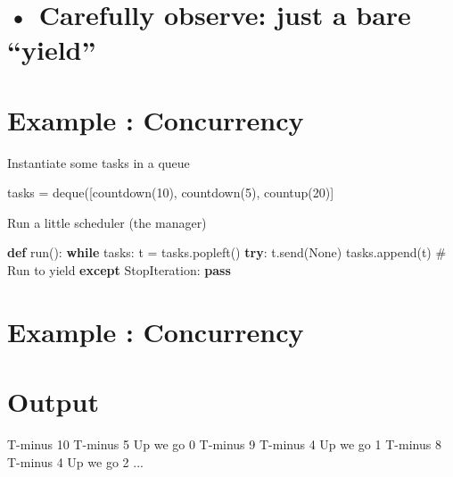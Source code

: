 \documentclass[
  letterpaper,
  DIV=11,
  numbers=noendperiod]{scrreprt}
\newenvironment{Shaded}{\begin{snugshade}}{\end{snugshade}}
\newcommand{\CommentTok}[1]{\textcolor[rgb]{0.37,0.37,0.37}{#1}}
\newcommand{\ControlFlowTok}[1]{\textcolor[rgb]{0.00,0.23,0.31}{\textbf{#1}}}
\newcommand{\KeywordTok}[1]{\textcolor[rgb]{0.00,0.23,0.31}{\textbf{#1}}}
\newcommand{\NormalTok}[1]{\textcolor[rgb]{0.00,0.23,0.31}{#1}}
\newcommand{\OperatorTok}[1]{\textcolor[rgb]{0.37,0.37,0.37}{#1}}
\newcommand{\PreprocessorTok}[1]{\textcolor[rgb]{0.68,0.00,0.00}{#1}}
\newcommand{\VariableTok}[1]{\textcolor[rgb]{0.07,0.07,0.07}{#1}}
\begin{document}

\chapter{• Carefully observe: just a bare
``yield''}\label{carefully-observe-just-a-bare-yield}


\chapter{Example : Concurrency}\label{example-concurrency-1}

Instantiate some tasks in a queue

\begin{Shaded}
\begin{Highlighting}[]
\NormalTok{tasks = deque([countdown(10), countdown(5), countup(20)] }
\end{Highlighting}
\end{Shaded}

Run a little scheduler (the manager)

\begin{Shaded}
\begin{Highlighting}[]
\KeywordTok{def}\NormalTok{ run():}
    \ControlFlowTok{while}\NormalTok{ tasks:}
\NormalTok{        t }\OperatorTok{=}\NormalTok{ tasks.popleft()}
        \ControlFlowTok{try}\NormalTok{:}
\NormalTok{            t.send(}\VariableTok{None}\NormalTok{)}
\NormalTok{            tasks.append(t)  }\CommentTok{\# Run to yield}
            \ControlFlowTok{except} \PreprocessorTok{StopIteration}\NormalTok{:}
                \ControlFlowTok{pass} 
\end{Highlighting}
\end{Shaded}


\chapter{Example : Concurrency}\label{example-concurrency-2}


\chapter{Output}\label{output}

\begin{Shaded}
\begin{Highlighting}[]
\NormalTok{T{-}minus 10  }
\NormalTok{T{-}minus 5  }
\NormalTok{Up we go 0  }
\NormalTok{T{-}minus 9  }
\NormalTok{T{-}minus 4  }
\NormalTok{Up we go 1  }
\NormalTok{T{-}minus 8  }
\NormalTok{T{-}minus 4  }
\NormalTok{Up we go 2  }
\NormalTok{... }
\end{Highlighting}
\end{Shaded}
\end{document}
